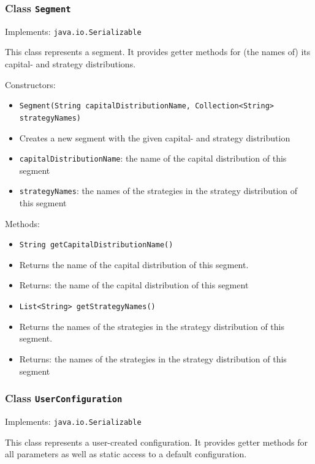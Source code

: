 \documentclass[parskip=full,11pt]{scrartcl}
\begin{document}
\subsubsection{Class \texttt{Segment}}
Implements: \texttt{java.io.Serializable}

This class represents a segment. It provides getter methods for (the names of) its capital- and strategy distributions.

Constructors:
\begin{itemize}\itemsep -10pt
\item \texttt{Segment(String capitalDistributionName, Collection<String> strategyNames)}
\item[] Creates a new segment with the given capital- and strategy distribution
\item[] \texttt{capitalDistributionName}: the name of the capital distribution of this segment
\item[] \texttt{strategyNames}: the names of the strategies in the strategy distribution of this segment
\end{itemize}

Methods:
\begin{itemize}\itemsep -10pt
\item \texttt{String getCapitalDistributionName()}
\item[] Returns the name of the capital distribution of this segment.
\item[] Returns: the name of the capital distribution of this segment

\item \texttt{List<String> getStrategyNames()}
\item[] Returns the names of the strategies in the strategy distribution of this segment.
\item[] Returns: the names of the strategies in the strategy distribution of this segment
\end{itemize}

\subsubsection{Class \texttt{UserConfiguration}}
Implements: \texttt{java.io.Serializable}

This class represents a user-created configuration. It provides getter methods for all parameters as well as static access to a default configuration.
\end{document}
